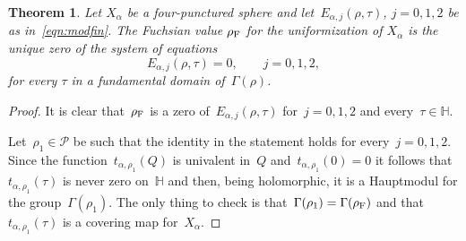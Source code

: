 \documentclass[pdftex]{sigma}
\newcommand{\Po}{\mathbb{H}}
\numberwithin{equation}{section}
\newtheorem{Theorem}{Theorem}[section]
\begin{document}
\begin{Theorem}\label{thm:main}Let $X_\alpha$ be a four-punctured sphere and let~$E_{\alpha,j}(\rho,\tau)$, $j=0,1,2$ be as in~\eqref{eqn:modfin}. The Fuchsian value $\rho_{\rm F}$ for the uniformization of $X_\alpha$ is the unique zero of the system of equations
\[
 E_{\alpha,j}(\rho,\tau)=0,\qquad j=0,1,2,
\]
for every $\tau$ in a fundamental domain of~$\Gamma(\rho)$.
\end{Theorem}
\begin{proof}It is clear that~$\rho_{\rm F}$ is a zero of~$E_{\alpha,j}(\rho,\tau)$ for~$j=0,1,2$ and every~$\tau\in\Po$.

Let~$\rho_1\in\mathcal{P}$ be such that the identity in the statement holds for every~$j=0,1,2$. Since the function~$t_{\alpha,\rho_1}(Q)$ is univalent in~$Q$ and~$t_{\alpha,\rho_1}(0)=0$ it follows that~$t_{\alpha,\rho_1}(\tau)$ is never zero on~$\Po$ and then, being holomorphic, it is a Hauptmodul for the group~$\Gamma(\rho_1)$. The only thing to check is that~$\Gamma(\rho_1)=\Gamma(\rho_{\rm F})$ and that~$t_{\alpha,\rho_1}(\tau)$ is a covering map for~$X_\alpha$.


\end{proof}
\end{document}

